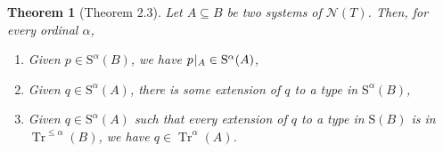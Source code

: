 \documentclass{article}
\newtheorem{theorem}{Theorem}[section]
\theoremstyle{nonumberplain}
\newcommand{\calN}{\mathcal{N}}
\newcommand{\Stone}{\mathrm{S}}
\DeclareMathOperator{\Tr}{Tr}
\newcommand{\rst}[2]{#1\mspace{1.3mu plus 0.5mu minus 0.5mu}|_{#2}}
\begin{document}
\begin{theorem}[Theorem 2.3]
Let $A \subseteq B$ be two systems of $\calN(T)$. Then, for every ordinal $\alpha$,
\begin{enumerate}[label=(\roman*)]
\item\label{item:thm2.3:i} Given $p \in \Stone^\alpha(B)$, we have $\rst p A \in \Stone^\alpha(A)$,
\item\label{item:thm2.3:ii} Given $q \in \Stone^\alpha(A)$, there is some extension of $q$ to a type in $\Stone^\alpha(B)$,
\item\label{item:thm2.3:iii} Given $q \in \Stone^\alpha(A)$ such that every extension of $q$ to a type in $\Stone(B)$ is in $\Tr^{\leq\alpha}(B)$, we have $q \in \Tr^\alpha(A)$.
\end{enumerate}
\end{theorem}
\end{document}
